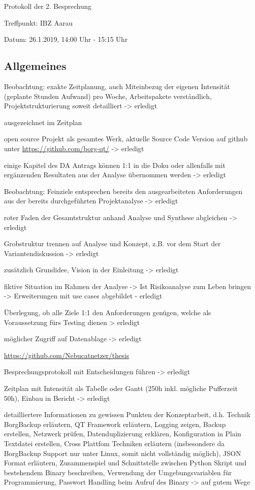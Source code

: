 \documentclass[a4paper,11pt]{article}
\begin{document}
Protokoll der 2. Besprechung

Treffpunkt: IBZ Aarau

Datum: 26.1.2019, 14:00 Uhr - 15:15 Uhr

\subsection*{Allgemeines}
\label{sec:org1cc8060}

Beobachtung: exakte Zeitplanung, auch Miteinbezug der eigenen Intensität
(geplante Stunden Aufwand) pro Woche, Arbeitspakete verständlich,
Projektstrukturierung soweit detailliert -> erledigt

ausgezeichnet im Zeitplan

open source Projekt als gesamtes Werk, aktuelle Source Code Version auf
github unter \url{https://github.com/borg-qt/} -> erledigt

einige Kapitel des DA Antrags können 1:1 in die Doku oder allenfalls mit
ergänzenden Resultaten aus der Analyse übernommen werden -> erledigt

Beobachtung: Feinziele entsprechen bereits den ausgearbeiteten Anforderungen
aus der bereits durchgeführten Projektanalyse -> erledigt

roter Faden der Gesamtstruktur anhand Analyse und Synthese abgleichen ->
erledigt

Grobstruktur trennen auf Analyse und Konzept, z.B. vor dem Start der
Variantendiskussion -> erledigt

zusätzlich Grundidee, Vision in der Einleitung -> erledigt

fiktive Situation im Rahmen der Analyse -> Ist Risikoanalyse zum Leben
bringen -> Erweiterungen mit use cases abgebildet - erledigt

Überlegung, ob alle Ziele 1:1 den Anforderungen genügen, welche als
Voraussetzung fürs Testing dienen > erledigt

möglicher Zugriff auf Datenablage -> erledigt

\url{https://github.com/Nebucatnetzer/thesis}

Besprechungsprotokoll mit Entscheidungen führen -> erledigt

Zeitplan mit Intensität als Tabelle oder Gantt (250h inkl. mögliche
Pufferzeit 50h), Einbau in Bericht -> erledigt

detailliertere Informationen zu gewissen Punkten der Konzeptarbeit, d.h.
Technik BorgBackup erläutern, QT Framework erläutern, Logging zeigen, Backup
erstellen, Netzwerk prüfen, Datenduplizierung erklären, Konfiguration in
Plain Textdatei erstellen, Cross Plattfom Techniken erläutern (insbesondere
da BorgBackup Support nur unter Linux, somit nicht vollständig möglich),
JSON Format erläutern, Zusammenspiel und Schnittstelle zwischen Python
Skript und bestehendem Binary beschreiben, Verwendung der Umgebungsvariablen
für Programmierung, Passwort Handling beim Aufruf des Binary -> auf gutem
Wege
\end{document}
